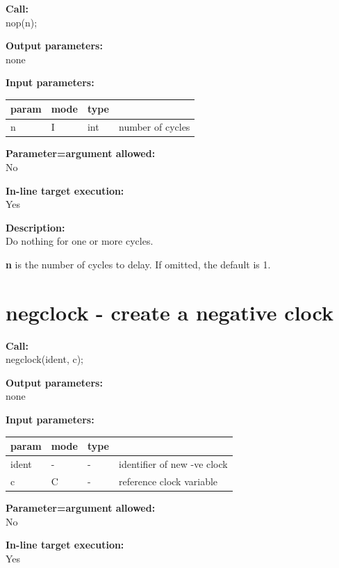         {\bf Call:} \\
        nop(n);
        
        {\bf Output parameters:} \\
        none
        
        {\bf Input parameters:} \\
        \begin{tabular}{| l | l | l | l |}
        \hline
        param & mode & type & \\
        \hline \hline
        n & I & int & number of cycles  \\ \hline
        \end{tabular}
        
        {\bf Parameter=argument allowed:} \\
        No
        
        {\bf In-line target execution:} \\
        Yes
        
        {\bf Description:} \\
        Do nothing for one or more cycles.
        
        {\bf n} is the number of cycles to delay. If omitted, the default is 1.


    \section{negclock - create a negative clock}\label{sec:ipnegclock}
        
        {\bf Call:} \\
        negclock(ident, c);
        
        {\bf Output parameters:} \\
        none
        
        {\bf Input parameters:} \\
        \begin{tabular}{| l | l | l | l |}
        \hline
        param & mode & type & \\
        \hline \hline
        ident & - & - & identifier of new -ve clock  \\ \hline
        c     & C & - & reference clock variable  \\ \hline
        \end{tabular}
        
        {\bf Parameter=argument allowed:} \\
        No
        
        {\bf In-line target execution:} \\
        Yes
        
